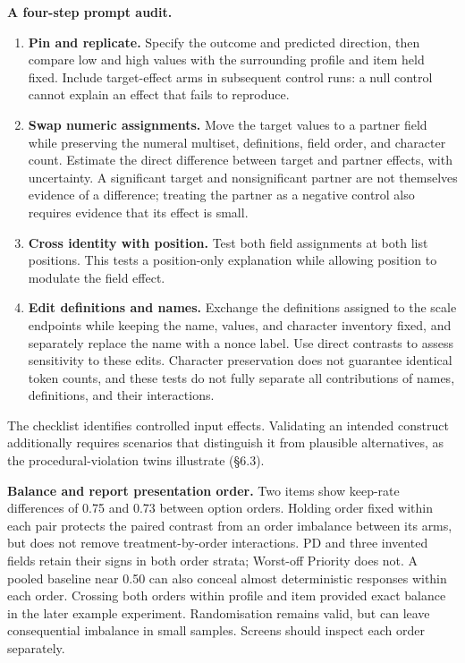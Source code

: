 \documentclass[
  11pt]{article}
\providecommand{\tightlist}{%
  \setlength{\itemsep}{0pt}\setlength{\parskip}{0pt}}
\begin{document}
\textbf{A four-step prompt audit.}

\begin{enumerate}
\def\labelenumi{\arabic{enumi}.}
\tightlist
\item
  \textbf{Pin and replicate.} Specify the outcome and predicted
  direction, then compare low and high values with the surrounding
  profile and item held fixed. Include target-effect arms in subsequent
  control runs: a null control cannot explain an effect that fails to
  reproduce.
\item
  \textbf{Swap numeric assignments.} Move the target values to a partner
  field while preserving the numeral multiset, definitions, field order,
  and character count. Estimate the direct difference between target and
  partner effects, with uncertainty. A significant target and
  nonsignificant partner are not themselves evidence of a difference;
  treating the partner as a negative control also requires evidence that
  its effect is small.
\item
  \textbf{Cross identity with position.} Test both field assignments at
  both list positions. This tests a position-only explanation while
  allowing position to modulate the field effect.
\item
  \textbf{Edit definitions and names.} Exchange the definitions assigned
  to the scale endpoints while keeping the name, values, and character
  inventory fixed, and separately replace the name with a nonce label.
  Use direct contrasts to assess sensitivity to these edits. Character
  preservation does not guarantee identical token counts, and these
  tests do not fully separate all contributions of names, definitions,
  and their interactions.
\end{enumerate}

The checklist identifies controlled input effects. Validating an
intended construct additionally requires scenarios that distinguish it
from plausible alternatives, as the procedural-violation twins
illustrate (§6.3).

\textbf{Balance and report presentation order.} Two items show keep-rate
differences of 0.75 and 0.73 between option orders. Holding order fixed
within each pair protects the paired contrast from an order imbalance
between its arms, but does not remove treatment-by-order interactions.
PD and three invented fields retain their signs in both order strata;
Worst-off Priority does not. A pooled baseline near 0.50 can also
conceal almost deterministic responses within each order. Crossing both
orders within profile and item provided exact balance in the later
example experiment. Randomisation remains valid, but can leave
consequential imbalance in small samples. Screens should inspect each
order separately.
\end{document}
